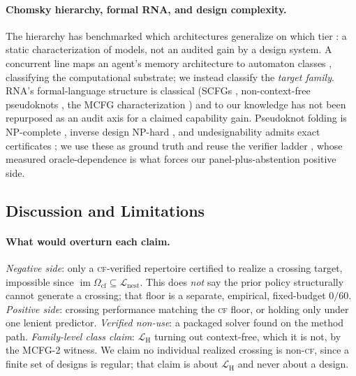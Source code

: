 \documentclass[11pt]{article}
\newcommand{\NESTED}{\ensuremath{\mathcal{L}_{\mathrm{nest}}}}
\newcommand{\CF}{\textsc{cf}}
\newcommand{\Ocf}{\ensuremath{\Omega_{\mathrm{cf}}}}
\newcommand{\citecompanion}{\citep{verifiereconomicsanon}}
\newcommand{\citecompanion}{\citep{verifiereconomics}}
\begin{document}
\paragraph{Chomsky hierarchy, formal RNA, and design complexity.} The hierarchy has benchmarked which
architectures generalize on which tier \citep{deletang2023}: a static characterization of models, not an
audited gain by a design system. A concurrent line maps an agent's memory architecture to automaton classes
\citep{agentsautomata2025}, classifying the computational substrate; we instead classify the \emph{target
family}. RNA's formal-language structure is classical (SCFGs \citep{rivaseddy2000,durbin1998}, non-context-free
pseudoknots \citep{nebelweinberg}, the MCFG characterization \citep{katosekikasami2006}) and to our knowledge
has not been repurposed as an audit axis for a claimed capability gain. Pseudoknot folding is NP-complete
\citep{lyngso2000pknot}, inverse design NP-hard \citep{bonnet2020hard}, and undesignability admits exact
certificates \citep{zhou2024rigende}; we use these as ground truth and reuse the verifier ladder
\citecompanion{}, whose measured oracle-dependence is what forces our panel-plus-abstention positive
side.

\subsection{Discussion and Limitations}\label{sec:disc}
\paragraph{What would overturn each claim.} \emph{Negative side}: only a \CF-verified repertoire certified to
realize a crossing target, impossible since $\operatorname{im}\Ocf\subseteq\NESTED$. This does \emph{not} say
the prior policy structurally cannot generate a crossing; that floor is a separate, empirical, fixed-budget
$0/60$. \emph{Positive side}: crossing performance matching the \CF{} floor, or holding only under one lenient
predictor. \emph{Verified non-use}: a packaged solver found on the method path. \emph{Family-level class
claim}: $\mathcal L_{\mathrm H}$ turning out context-free, which it is not, by the MCFG-2 witness. We claim no
individual realized crossing is non-\CF, since a finite set of designs is regular; that claim is about
$\mathcal L_{\mathrm H}$ and never about a design.
\end{document}
